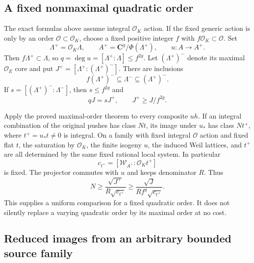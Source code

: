 \subsection{A fixed nonmaximal quadratic order}\label{a-fixed-nonmaximal-quadratic-order}

The exact formulas above assume integral \(\mathcal O_K\) action. If the fixed generic action is only by an order \(\mathcal O\subset\mathcal O_K\), choose a fixed positive integer \(f\) with \(f\mathcal O_K\subset\mathcal O\). Set \[
 \Lambda^+=\mathcal O_K\Lambda,
 \qquad A^+=\mathbf C^g/\Phi(\Lambda^+),
 \qquad u:A\to A^+.
\] Then \(f\Lambda^+\subset\Lambda\), so \(q=\deg u=[\Lambda^+:\Lambda]\le f^{2g}\). Let \((\Lambda^+)^-\) denote its maximal \(\mathcal O_E\) core and put \(J^+=[\Lambda^+:(\Lambda^+)^-]\). There are inclusions \[
 f(\Lambda^+)^-\subseteq\Lambda^-\subseteq(\Lambda^+)^-.
\] If \(s=[(\Lambda^+)^-:\Lambda^-]\), then \(s\le f^{2g}\) and \[
 qJ=sJ^+,
 \qquad J^+\ge J/f^{2g}.
\tag{B23.15}
\]

Apply the proved maximal-order theorem to every composite \(uh\). If an integral combination of the original pushes has class \(Nt\), its image under \(u_*\) has class \(N t^+\), where \(t^+=u_*t\ne0\) is integral. On a family with fixed integral \(\mathcal O\) action and fixed flat \(t\), the saturation by \(\mathcal O_K\), the finite isogeny \(u\), the induced Weil lattices, and \(t^+\) are all determined by the same fixed rational local system. In particular \[
 c_{t^+}=[\mathscr W_{A^+}:\mathcal O_Kt^+]
\] is fixed. The projector commutes with \(u\) and keeps denominator \(R\). Thus \[
 N\ge\frac{\sqrt{J^+}}{R\sqrt{c_{t^+}}}
 \ge\frac{\sqrt J}{R f^g\sqrt{c_{t^+}}}.
\tag{B23.16}
\] This supplies a uniform comparison for a fixed quadratic order. It does not silently replace a varying quadratic order by its maximal order at no cost.

\subsection{Reduced images from an arbitrary bounded source family}\label{reduced-images-from-an-arbitrary-bounded-source-family}

